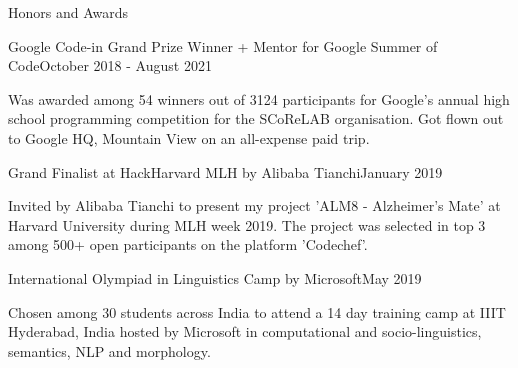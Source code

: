 \documentclass[
	a4paper, %
    10pt, %
]{resume} %
\begin{document}
\begin{rSection}{Honors and Awards}

	\begin{achSubsection}{Google Code-in Grand Prize Winner + Mentor for Google Summer of Code}{October 2018 - August 2021}
		\item Was awarded among 54 winners out of 3124 participants for Google's annual high school programming competition for the SCoReLAB organisation. Got flown out to Google HQ, Mountain View on an all-expense paid trip.
	\end{achSubsection}




	\begin{achSubsection}{Grand Finalist at HackHarvard MLH by Alibaba Tianchi}{January 2019}
		\item Invited by Alibaba Tianchi to present my project 'ALM8 - Alzheimer's Mate' at Harvard University during MLH week 2019. The project was selected in top 3 among 500+ open participants on the platform 'Codechef'.
	\end{achSubsection}


	\begin{achSubsection}{International Olympiad in Linguistics Camp by Microsoft}{May 2019}
		\item Chosen among 30 students across India to attend a 14 day training camp at IIIT Hyderabad, India hosted by Microsoft in computational and socio-linguistics, semantics, NLP and morphology.
	\end{achSubsection}

\end{rSection}




\end{document}
